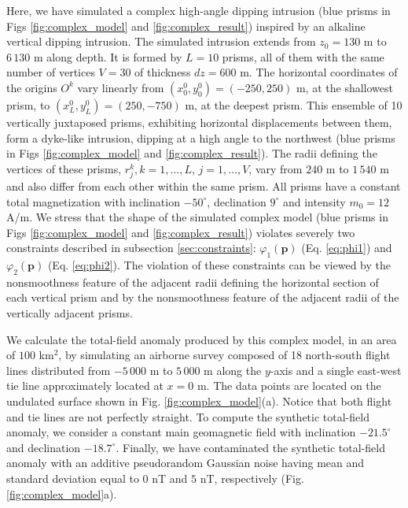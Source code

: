 Here, we have simulated a complex high-angle dipping intrusion (blue prisms in Figs \ref{fig:complex_model} and \ref{fig:complex_result}) inspired by an alkaline vertical dipping intrusion. 
The simulated intrusion extends from $z_0=130$ m to $6\,130$ m along depth.
It is formed by $ L = 10 $ prisms, all of them with the same number of vertices $ V = 30 $ of thickness $ dz = 600 $ m. 
The horizontal coordinates of the origins $ O^k $ vary linearly from $ (x_0^0, y_0^0) = (-250, 250) $ m, at the shallowest prism, to $ (x_L^0, y_L^0) = (250, -750) $ m, at the deepest prism. 
This ensemble of 10 vertically juxtaposed prisms, exhibiting horizontal displacements between them, form a dyke-like intrusion, dipping at a high angle to the northwest (blue prisms in Figs \ref{fig:complex_model} and \ref{fig:complex_result}). 
The radii defining the vertices of these prisms, $ r^k_j, k = 1, \dots, L$, $j = 1,\dots, V$, 
vary from $ 240 $ m to $ 1\,540 $ m and also differ from each other within the same prism. 
All prisms have a constant total magnetization with inclination $ -50^\circ $, declination $ 9^\circ $ and intensity $ m_0 = 12 $ A/m. 
We stress that the shape of the simulated complex model (blue prisms in Figs \ref{fig:complex_model} and \ref{fig:complex_result}) violates severely two constraints described in subsection \ref{sec:constraints}: $\varphi_{1}(\mathbf{p})$ (Eq. \ref{eq:phi1})
and $\varphi_{2}(\mathbf{p})$ (Eq. \ref{eq:phi2}).
The violation of these constraints can be viewed by the nonsmoothness feature of the adjacent radii defining the horizontal section of each vertical prism and by the nonsmoothness feature of the adjacent radii of the vertically adjacent prisms.

We calculate the total-field anomaly produced by this complex model, in an area of $ 100 $ km$^2 $, by simulating an airborne survey composed of 18 north-south flight lines distributed from $ -5\,000 $ m to $ 5\,000 $ m along the $ y $-axis and a single east-west tie line approximately located at $ x = 0 $ m. 
The data points are located on the undulated surface shown in Fig. \ref{fig:complex_model}(a). Notice that both flight and tie lines are not perfectly straight. 
To compute the synthetic total-field anomaly, we consider a constant main geomagnetic field with inclination $ -21.5^\circ $ and declination $ -18.7^\circ $. 
Finally, we have contaminated the synthetic total-field anomaly with an additive pseudorandom Gaussian noise having mean and standard deviation equal to $0$ nT and $5$ nT, respectively (Fig. \ref{fig:complex_model}a).

